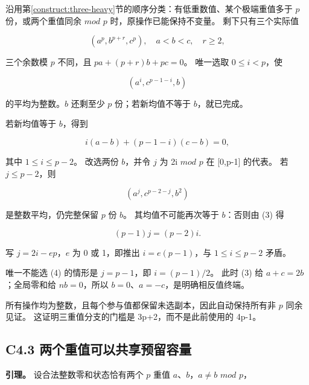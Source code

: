 {沿用}第\ref{construct:three-heavy}节{的顺序分类：有低重数值、某个极端重值多于} {\ensuremath{p}} {份，或两个重值同余} {\ensuremath{mod}} {\ensuremath{p}} {时，原操作已能保持不变量。} {剩下只有三个实际值}

\[
(a^p,b^{p+r},c^p),\quad a<b<c,\quad r\ge2,
\]

{三个余数模} {\ensuremath{p}} {不同，且} {\ensuremath{pa+(p+r)b+pc=0}。} {唯一选取} {\ensuremath{0\le i<p}，使}

\[
(a^i,c^{p-1-i},b)
\]

{的平均为整数。\ensuremath{b}} {还剩至少} {\ensuremath{p}} {份；若新均值不等于} {\ensuremath{b}，就已完成。}

{若新均值等于} {\ensuremath{b}，得到}

\[
i(a-b)+(p-1-i)(c-b)=0,
\tag{C4.3}
\]

{其中} {\ensuremath{1\le i\le p-2}。} {改选两份} {\ensuremath{b}，并令} {\ensuremath{j}} {为} {2i} {\ensuremath{mod}} {\ensuremath{p}} {在} {{[}0,p-1{]}} {的代表。} {若} {\ensuremath{j\le p-2}，则}

\[
(a^j,c^{p-2-j},b^2)
\tag{C4.4}
\]

{是整数平均，仍完整保留} {\ensuremath{p}} {份} {\ensuremath{b}。} {其均值不可能再次等于} {\ensuremath{b}：否则由} {(3)} {得}

\[
(p-1)j=(p-2)i.
\]

{写} {\ensuremath{j=2i-ep}，\ensuremath{e}} {为} {0} {或} {1，即推出} {\ensuremath{i=e(p-1)}，与} {\ensuremath{1\le i\le p-2}} {矛盾。}

{唯一不能选} {(4)} {的情形是} {\ensuremath{j=p-1}，即} {\ensuremath{i=(p-1)/2}。} {此时} {(3)} {给} {\ensuremath{a+c=2b}；全局零和给} {\ensuremath{nb=0}，所以} {\ensuremath{b=0}、\ensuremath{a=-c}，是明确相反值终端。}

{所有操作均为整数，且每个参与值都保留未选副本，因此自动保持所有非} {\ensuremath{p}} {同余见证。} {这证明三重值分支的门槛是} {3p+2，而不是此前使用的} {4p-1。}

\subsection*{\texorpdfstring{{C4.3} {两个重值可以共享预留容量}}{C4.3 两个重值可以共享预留容量}}\label{C4-h21}

\textbf{{引理。}} {设合法整数零和状态恰有两个} {\ensuremath{p}} {重值} {\ensuremath{a}、\ensuremath{b}，\ensuremath{a\ne b}} {\ensuremath{mod}} {\ensuremath{p}，}

